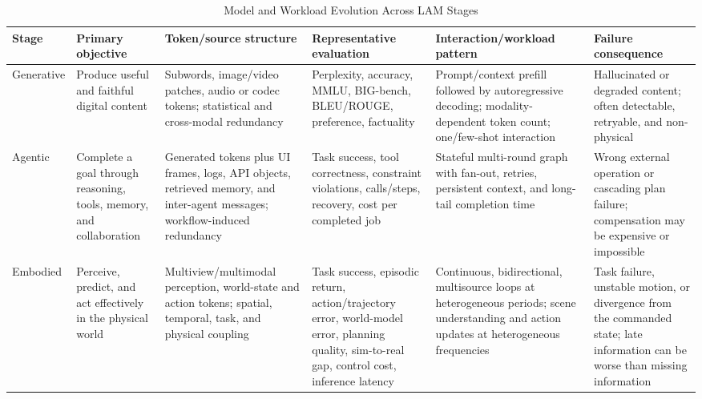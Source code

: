 \documentclass[letterpaper,journal]{IEEEtran}
\begin{document}
\begin{table}[t]
\caption{Model and Workload Evolution Across LAM Stages}
\label{tab:modeltaxonomy}
\centering
\footnotesize
\renewcommand{\arraystretch}{1.18}
\setlength{\tabcolsep}{3.2pt}
\begin{tabular}{|p{}|p{}|p{}|p{}|p{}|p{}|}
\hline
\textbf{Stage} & \textbf{Primary objective} & \textbf{Token/source structure}
& \textbf{Representative evaluation} & \textbf{Interaction/workload pattern}
& \textbf{Failure consequence} \\ \hline
Generative &
Produce useful and faithful digital content &
Subwords, image/video patches, audio or codec tokens; statistical and
cross-modal redundancy &
Perplexity, accuracy, MMLU, BIG-bench, BLEU/ROUGE, preference, factuality &
Prompt/context prefill followed by autoregressive decoding; modality-dependent
token count; one/few-shot interaction &
Hallucinated or degraded content; often detectable, retryable, and
non-physical \\ \hline
Agentic &
Complete a goal through reasoning, tools, memory, and collaboration &
Generated tokens plus UI frames, logs, API objects, retrieved memory, and
inter-agent messages; workflow-induced redundancy &
Task success, tool correctness, constraint violations, calls/steps, recovery,
cost per completed job &
Stateful multi-round graph with fan-out, retries, persistent context, and
long-tail completion time &
Wrong external operation or cascading plan failure; compensation may be
expensive or impossible \\ \hline
Embodied &
Perceive, predict, and act effectively in the physical world &
Multiview/multimodal perception, world-state and action tokens; spatial,
temporal, task, and physical coupling &
Task success, episodic return, action/trajectory error, world-model error,
planning quality, sim-to-real gap, control cost, inference latency &
Continuous, bidirectional, multisource loops at heterogeneous periods;
scene understanding and action updates at heterogeneous frequencies &
Task failure, unstable motion, or divergence from the commanded state; late
information can be worse than missing information \\ \hline
\end{tabular}
\end{table}
\end{document}
